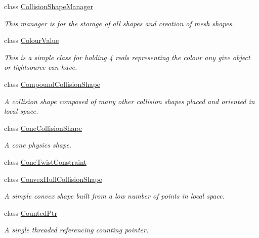 \begin{DoxyCompactItemize}
class \hyperlink{classMezzanine_1_1CollisionShapeManager}{CollisionShapeManager}
\begin{DoxyCompactList}\small\item\em This manager is for the storage of all shapes and creation of mesh shapes. \item\end{DoxyCompactList}\item 
class \hyperlink{classMezzanine_1_1ColourValue}{ColourValue}
\begin{DoxyCompactList}\small\item\em This is a simple class for holding 4 reals representing the colour any give object or lightsource can have. \item\end{DoxyCompactList}\item 
class \hyperlink{classMezzanine_1_1CompoundCollisionShape}{CompoundCollisionShape}
\begin{DoxyCompactList}\small\item\em A collision shape composed of many other collision shapes placed and oriented in local space. \item\end{DoxyCompactList}\item 
class \hyperlink{classMezzanine_1_1ConeCollisionShape}{ConeCollisionShape}
\begin{DoxyCompactList}\small\item\em A cone physics shape. \item\end{DoxyCompactList}\item 
class \hyperlink{classMezzanine_1_1ConeTwistConstraint}{ConeTwistConstraint}
\item 
class \hyperlink{classMezzanine_1_1ConvexHullCollisionShape}{ConvexHullCollisionShape}
\begin{DoxyCompactList}\small\item\em A simple convex shape built from a low number of points in local space. \item\end{DoxyCompactList}\item 
class \hyperlink{classMezzanine_1_1CountedPtr}{CountedPtr}
\begin{DoxyCompactList}\small\item\em A single threaded referencing counting pointer. \item\end{DoxyCompactList}\item 

\end{DoxyCompactItemize}
